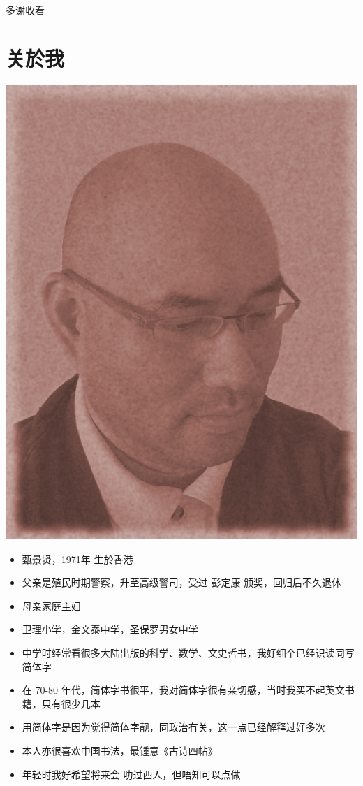 多谢收看 \smiley
\printbibliography


\section{关於我}
\fontsize{12pt}{7.2}\selectfont

\includegraphics[scale=0.15]{../John_Grothendieck.png}

		\begin{itemize}
			\item 甄景贤，1971年 生於香港
			\item 父亲是殖民时期警察，升至高级警司，受过 彭定康 颁奖，回归后不久退休
			\item 母亲家庭主妇
			\item 卫理小学，金文泰中学，圣保罗男女中学
			\item 中学时经常看很多大陆出版的科学、数学、文史哲书，我好细个已经识读同写简体字
			\item 在 70-80 年代，简体字书很平，我对简体字很有亲切感，当时我买不起英文书籍，只有很少几本
			\item 用简体字是因为觉得简体字靓，同政治冇关，这一点已经解释过好多次
			\item 本人亦很喜欢中国书法，最锺意《古诗四帖》
			\item 年轻时我好希望将来会 叻过西人，但唔知可以点做
		\end{itemize}

